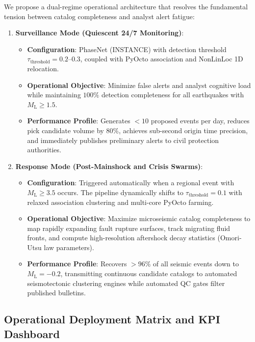 We propose a dual-regime operational architecture that resolves the fundamental tension between catalog completeness and analyst alert fatigue:

\begin{enumerate}
  \item \textbf{Surveillance Mode (Quiescent 24/7 Monitoring)}:
  \begin{itemize}
    \item \textbf{Configuration}: PhaseNet (INSTANCE) with detection threshold $\tau_{\mathrm{threshold}} = 0.2\text{--}0.3$, coupled with PyOcto association and NonLinLoc 1D relocation.
    \item \textbf{Operational Objective}: Minimize false alerts and analyst cognitive load while maintaining $100\%$ detection completeness for all earthquakes with $M_{\mathrm{L}} \ge 1.5$.
    \item \textbf{Performance Profile}: Generates $< 10$ proposed events per day, reduces pick candidate volume by $80\%$, achieves sub-second origin time precision, and immediately publishes preliminary alerts to civil protection authorities.
  \end{itemize}

  \item \textbf{Response Mode (Post-Mainshock and Crisis Swarms)}:
  \begin{itemize}
    \item \textbf{Configuration}: Triggered automatically when a regional event with $M_{\mathrm{L}} \ge 3.5$ occurs. The pipeline dynamically shifts to $\tau_{\mathrm{threshold}} = 0.1$ with relaxed association clustering and multi-core PyOcto farming.
    \item \textbf{Operational Objective}: Maximize microseismic catalog completeness to map rapidly expanding fault rupture surfaces, track migrating fluid fronts, and compute high-resolution aftershock decay statistics (Omori-Utsu law parameters).
    \item \textbf{Performance Profile}: Recovers $> 96\%$ of all seismic events down to $M_{\mathrm{L}} = -0.2$, transmitting continuous candidate catalogs to automated seismotectonic clustering engines while automated QC gates filter published bulletins.
  \end{itemize}
\end{enumerate}

\subsection{Operational Deployment Matrix and KPI Dashboard}
\label{subsec:kpi_dashboard}

